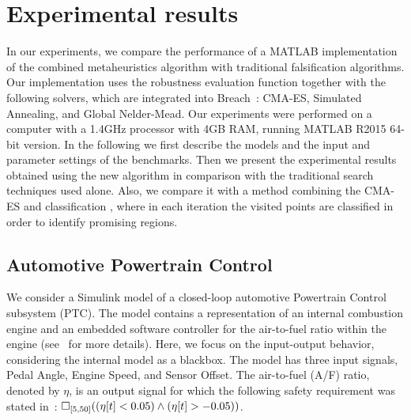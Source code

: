 \section{Experimental results}\label{sec:expres}

In our experiments, we compare the performance of a MATLAB
implementation of the combined metaheuristics algorithm with traditional falsification algorithms. Our implementation uses
the robustness evaluation function together with the following solvers, which are integrated into Breach~\cite{DBLP:conf/cav/Donze10}: CMA-ES, Simulated Annealing, and Global
Nelder-Mead. 
Our experiments were performed on a computer with a 1.4GHz processor with 4GB RAM, running 
MATLAB R2015 64-bit version. 
In the following we first describe the models and the input and parameter settings of the benchmarks. Then we present the experimental results obtained using the new algorithm in comparison with the traditional search techniques used alone. Also, we compare it with a method combining
the CMA-ES and classification \cite{CAV2017}, where in each iteration the visited points are classified in order to identify promising regions.


\subsection{Automotive Powertrain Control} \label{sec:PTC}
We consider a Simulink model of a closed-loop automotive Powertrain Control
subsystem (PTC). The model contains a representation of an internal combustion engine and an
embedded software controller for the air-to-fuel ratio within the
engine (see~\cite{Dreossi2015} for more details). Here, we
focus on the input-output behavior, considering the
internal model as a blackbox. The model has three input signals,
Pedal Angle, Engine Speed, and Sensor Offset.
The air-to-fuel (A/F) ratio, denoted by $\eta$, is an
output signal for which the following safety requirement was stated
in~\cite{Dreossi2015}: %
$\Box_{[5,50]}( (\eta[t] < 0.05) \land ( \eta[t] > - 0.05 ))$.

